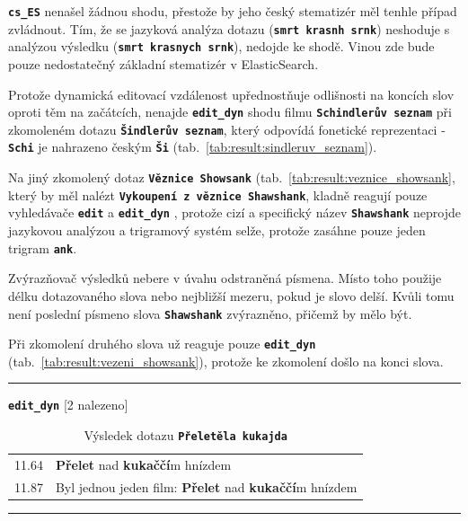 \documentclass[11pt,letterpaper,oneside,openright]{book}
\newcommand{\bftt}[1]{\texttt{\textbf{#1}}}
\newcommand{\boldred}[1]{\textbf{\color{red} #1}}
\newcommand{\horizlina}%
{
    \mbox{}\vspace{1em}
    \hrule
    \mbox{}
}
\begin{document}
\bftt{cs\_ES} nenašel žádnou shodu, přestože by jeho český stematizér měl
tenhle případ zvládnout. Tím, že se jazyková analýza dotazu
(\bftt{smrt~krasnh~srnk}) neshoduje s analýzou výsledku
(\bftt{smrt~krasnych~srnk}), nedojde ke shodě. Vinou zde bude pouze
nedostatečný základní stematizér v ElasticSearch.

\mbox{}\mbox{}

Protože dynamická editovací vzdálenost upřednostňuje odlišnosti na
koncích slov oproti těm na začátcích, nenajde \bftt{edit\_dyn} shodu
filmu \bftt{Schindlerův seznam} při zkomoleném dotazu \bftt{Šindlerův
seznam}, který odpovídá fonetické reprezentaci - \bftt{Schi} je
nahrazeno českým \bftt{Ši} (tab.~\ref{tab:result:sindleruv_seznam}).

\mbox{}\mbox{}

Na jiný zkomolený dotaz \bftt{Věznice Showsank}
(tab.~\ref{tab:result:veznice_showsank}, který by měl nalézt \bftt{Vykoupení z
věznice Shawshank}, kladně reagují pouze vyhledávače \bftt{edit} a
\bftt{edit\_dyn} , protože cizí a specifický název \bftt{Shawshank} neprojde
jazykovou analýzou a trigramový systém selže, protože zasáhne pouze jeden
trigram \bftt{ank}.

Zvýrazňovač výsledků nebere v úvahu odstraněná písmena. Místo toho použije
délku dotazovaného slova nebo nejbližší mezeru, pokud je slovo delší. Kvůli
tomu není poslední písmeno slova \bftt{Shawshank} zvýrazněno, přičemž by mělo
být.

\mbox{}\mbox{}

Při zkomolení druhého slova už reaguje pouze \bftt{edit\_dyn}
(tab.~\ref{tab:result:vezeni_showsank}), protože ke zkomolení došlo na
konci slova.

\mbox{}\mbox{}

\begin{table}[H]
\begin{tt}
\horizlina

\bftt{edit\_dyn} [2 nalezeno]\vspace{5pt}

\begin{tabulary}{1.1\textwidth}{LL}
11.64 & \boldred{Přelet} nad \boldred{kukaččí}m hnízdem \\
11.87 & Byl jednou jeden film: \boldred{Přelet} nad \boldred{kukaččí}m hnízdem \\
\end{tabulary}
\horizlina

\end{tt}
\caption{Výsledek dotazu \bftt{Přeletěla kukajda}}
\label{tab:result:preletela_kukajda}
\end{table}
\end{document}
